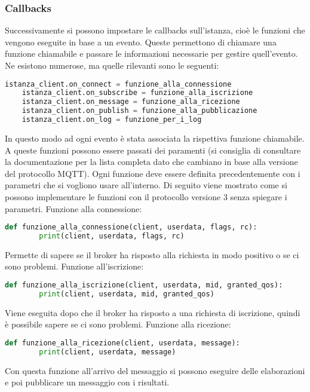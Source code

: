 \subsubsection{Callbacks}
\label{subsubsec:client-creazione-connesione-callbacks}
Successivamente si possono impostare le callbacks sull'istanza, cioè le funzioni che vengono eseguite in base a un evento.
Queste permettono di chiamare una funzione chiamabile e passare le informazioni necessarie per gestire quell'evento.
Ne esistono numerose, ma quelle rilevanti sono le seguenti:
\begin{lstlisting}[language=Python]
	istanza_client.on_connect = funzione_alla_connessione
	istanza_client.on_subscribe = funzione_alla_iscrizione
	istanza_client.on_message = funzione_alla_ricezione
	istanza_client.on_publish = funzione_alla_pubblicazione
	istanza_client.on_log = funzione_per_i_log
\end{lstlisting}
In questo modo ad ogni evento è stata associata la rispettiva funzione chiamabile.
A queste funzioni possono essere passati dei paramenti (si consiglia di consultare la documentazione per la lista completa dato che cambiano in base alla versione del protocollo MQTT).
Ogni funzione deve essere definita precedentemente con i parametri che si vogliono usare all'interno.
Di seguito viene mostrato come si possono implementare le funzioni con il protocollo versione 3 senza spiegare i parametri.\newline
Funzione alla connessione:
\begin{lstlisting}[language=python]
	def funzione_alla_connessione(client, userdata, flags, rc):
		print(client, userdata, flags, rc)
\end{lstlisting}
Permette di sapere se il broker ha risposto alla richiesta in modo positivo o se ci sono problemi.\newline
Funzione all'iscrizione:
\begin{lstlisting}[language=python]
	def funzione_alla_iscrizione(client, userdata, mid, granted_qos):
		print(client, userdata, mid, granted_qos)
\end{lstlisting}
Viene eseguita dopo che il broker ha risposto a una richiesta di iscrizione,
quindi è possibile sapere se ci sono problemi.\newline
Funzione alla ricezione:
\begin{lstlisting}[language=python]
	def funzione_alla_ricezione(client, userdata, message):
		print(client, userdata, message)
\end{lstlisting}
Con questa funzione all'arrivo del messaggio si possono eseguire delle elaborazioni e poi pubblicare un messaggio con i risultati.\newline
